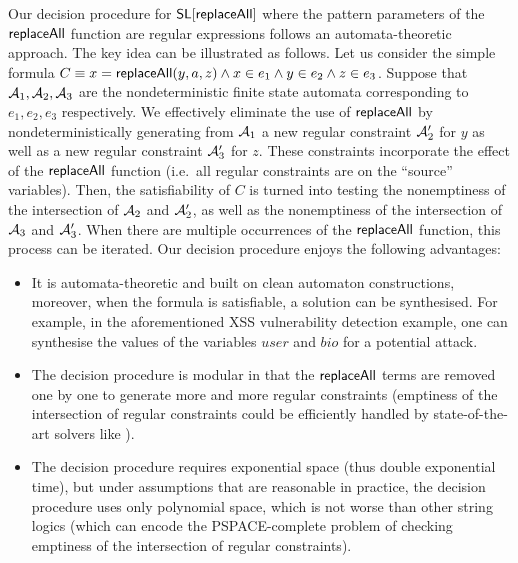Our decision procedure for $\mathsf{SL}[\mathsf{replaceAll}]$ where the pattern parameters
of the $\mathsf{replaceAll}$ function are regular expressions follows an 
automata-theoretic approach. The key idea can be illustrated as follows. Let 
us consider the simple formula $C \equiv x = \mathsf{replaceAll}(y, a, z) \wedge x \in e_1 \wedge y \in e_2 \wedge z \in e_3$. 
Suppose that $\mathcal{A}_1,\mathcal{A}_2,\mathcal{A}_3$ are the nondeterministic finite state automata corresponding to $e_1,e_2,e_3$ respectively. 
We effectively eliminate the use of $\mathsf{replaceAll}$ by nondeterministically
generating from $\mathcal{A}_1$ a new regular constraint $\mathcal{A}'_2$ for $y$ as well as a new regular constraint
$\mathcal{A}'_3$ for $z$.   These constraints incorporate the effect of the
$\mathsf{replaceAll}$ function (i.e.\ all regular constraints are on the ``source'' variables).
Then, the satisfiability of $C$ is turned into testing the nonemptiness of the intersection of $\mathcal{A}_2$ and $\mathcal{A}'_2$, as well as the nonemptiness of the intersection of $\mathcal{A}_3$ and $\mathcal{A}'_3$. When there are multiple occurrences of the $\mathsf{replaceAll}$ function, this process can be iterated. 
Our decision procedure enjoys the following advantages:
\begin{itemize}
	\item It is automata-theoretic and built on clean automaton constructions, 
        moreover, when the formula is satisfiable, a solution can be 
        synthesised. For example, in the aforementioned XSS vulnerability detection example, one can synthesise the values of the variables $user$ and $bio$ for a potential attack. 
	\item The decision procedure is modular in
        that the $\mathsf{replaceAll}$ terms are removed one by one to
        generate more and more regular constraints (emptiness of the
        intersection of regular constraints could be efficiently handled by
        state-of-the-art solvers like \cite{fang-yu-circuits}).  
    \item The decision procedure requires exponential space (thus double
        exponential time), but under assumptions that are reasonable in practice, 
        the decision procedure uses only polynomial space, which is not
        worse than other string logics (which can encode the PSPACE-complete
        problem of checking emptiness of the intersection of regular 
        constraints). 
\end{itemize}


